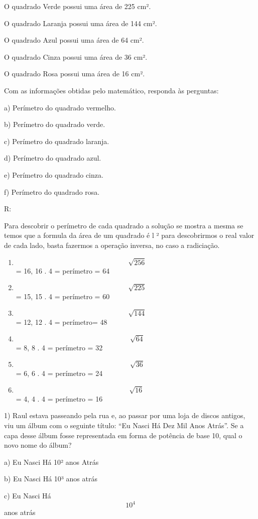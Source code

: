 O quadrado Verde possui uma área de 225 cm².

O quadrado Laranja possui uma área de 144 cm².

O quadrado Azul possui uma área de 64 cm².

O quadrado Cinza possui uma área de 36 cm².

O quadrado Rosa possui uma área de 16 cm².

Com as informações obtidas pelo matemático, responda às perguntas:

a) Perímetro do quadrado vermelho.

b) Perímetro do quadrado verde.

c) Perímetro do quadrado laranja.

d) Perímetro do quadrado azul.

e) Perímetro do quadrado cinza.

f) Perímetro do quadrado rosa.

R:

Para descobrir o perímetro de cada quadrado a solução se mostra a mesma
se temos que a formula da área de um quadrado é l ² para descobrirmos o
real valor de cada lado, basta fazermos a operação inversa, no caso a
radiciação.

\begin{enumerate}
\def\labelenumi{\alph{enumi})}
\item
  \[\ \sqrt{256}\] = 16, 16 . 4 = perímetro = 64
\item
  \[\ \sqrt{225}\] = 15, 15 . 4 = perímetro = 60
\item
  \[\ \sqrt{144}\] = 12, 12 . 4 = perímetro= 48
\item
  \[\ \sqrt{64}\] = 8, 8 . 4 = perímetro = 32
\item
  \[\ \sqrt{36}\] = 6, 6 . 4 = perímetro = 24
\item
  \[\sqrt{16}\] = 4, 4 . 4 = perímetro = 16
\end{enumerate}


1) Raul estava passeando pela rua e, ao passar por uma loja de discos
antigos, viu um álbum com o seguinte título: ``Eu Nasci Há Dez Mil Anos
Atrás''. Se a capa desse álbum fosse representada em forma de potência
de base 10, qual o novo nome do álbum?

a) Eu Nasci Há 10² anos Atrás

b) Eu Nasci Há 10³ anos atrás

c) Eu Nasci Há \[10^4\] anos atrás

